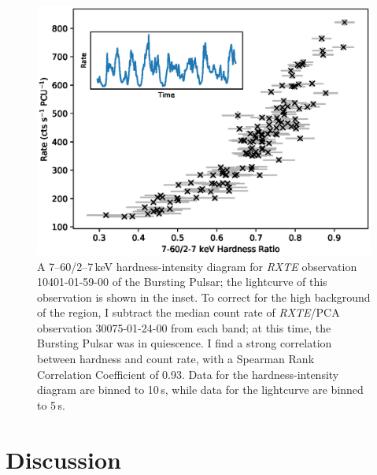 \begin{figure}
 \centering
 \includegraphics[width=.82\linewidth, trim={0.6cm 0.1cm 1.0cm 1.1cm},clip]{images/hr.eps}
 \caption[A 7--60/2--7\,keV hardness-intensity diagram for \textit{RXTE} observation 10401-01-59-00 of the Bursting Pulsar.]{A 7--60/2--7\,keV hardness-intensity diagram for \indexrxte\textit{RXTE} observation 10401-01-59-00 of the Bursting Pulsar; the lightcurve of this observation is shown in the inset. To correct for the high background of the region, I subtract the median count rate of \indexpca\textit{RXTE}/PCA observation 30075-01-24-00 from each band; at this time, the Bursting Pulsar was in quiescence. I find a strong correlation between hardness and count rate, with a Spearman Rank Correlation Coefficient of 0.93. Data for the hardness-intensity diagram are binned to 10\,s, while data for the lightcurve are binned to 5\,s.}
 \label{fig:HR}
\end{figure}

\section{Discussion}

